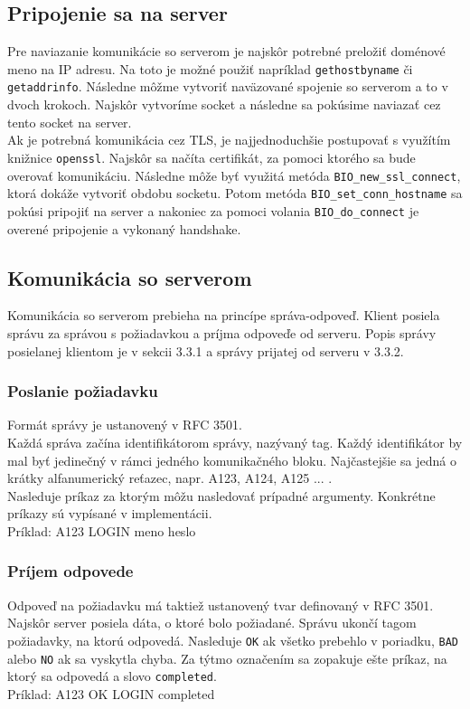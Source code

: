\documentclass{article}
\begin{document}
\subsection{Pripojenie sa na server}
Pre naviazanie komunikácie so serverom je najskôr potrebné preložiť doménové meno na IP adresu. Na toto je možné použiť napríklad \texttt{gethostbyname} či \texttt{getaddrinfo}. Následne môžme vytvoriť naväzované spojenie so serverom a to v dvoch krokoch. Najskôr vytvoríme socket a následne sa pokúsime naviazať cez tento socket na server.\\
Ak je potrebná komunikácia cez TLS, je najjednoduchšie postupovať s využítím knižnice \texttt{openssl}. Najskôr sa načíta certifikát, za pomoci ktorého sa bude overovať komunikáciu. Následne môže byť využitá metóda \texttt{BIO\_new\_ssl\_connect}, ktorá dokáže vytvoriť obdobu socketu. Potom metóda \texttt{BIO\_set\_conn\_hostname} sa pokúsi pripojiť na server a nakoniec za pomoci volania \texttt{BIO\_do\_connect} je overené pripojenie a vykonaný handshake.
\subsection{Komunikácia so serverom}
Komunikácia so serverom prebieha na princípe správa-odpoveď. Klient posiela správu za správou s požiadavkou a príjma odpoveďe od serveru. Popis správy posielanej klientom je v sekcii 3.3.1 a správy prijatej od serveru v 3.3.2.

\subsubsection{Poslanie požiadavku}
Formát správy je ustanovený v RFC 3501.\\
Každá správa začína identifikátorom správy, nazývaný tag. Každý identifikátor by mal byť jedinečný v rámci jedného komunikačného bloku. Najčastejšie sa jedná o krátky alfanumerický reťazec, napr. A123, A124, A125 ... .\\
Nasleduje príkaz za ktorým môžu nasledovať prípadné argumenty. Konkrétne príkazy sú vypísané v implementácii.\\
Príklad: A123 LOGIN meno heslo

\subsubsection{Príjem odpovede}
Odpoveď na požiadavku má taktiež ustanovený tvar definovaný v RFC 3501.\\
Najskôr server posiela dáta, o ktoré bolo požiadané. Správu ukončí tagom požiadavky, na ktorú odpovedá. Nasleduje \texttt{OK} ak všetko prebehlo v poriadku, \texttt{BAD} alebo \texttt{NO} ak sa vyskytla chyba. Za týtmo označením sa zopakuje ešte príkaz, na ktorý sa odpovedá a slovo \texttt{completed}.\\
Príklad: A123 OK LOGIN completed
\end{document}
